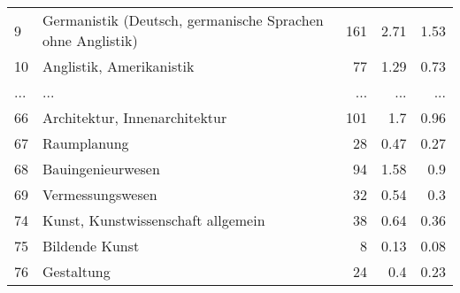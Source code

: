 \begin{longtable}{lXrrr}
        9 & \multicolumn{1}{X}{Germanistik (Deutsch, germanische Sprachen ohne Anglistik)} & %
          \num{161} &
          \num[round-mode=places,round-precision=2]{2.71} &
          \num[round-mode=places,round-precision=2]{1.53} \\
        10 & \multicolumn{1}{X}{Anglistik, Amerikanistik} & %
          \num{77} &
          \num[round-mode=places,round-precision=2]{1.29} &
          \num[round-mode=places,round-precision=2]{0.73} \\
       ... & ... & ... & ... & ... \\
        66 & \multicolumn{1}{X}{Architektur, Innenarchitektur} & %
          \num{101} &
          \num[round-mode=places,round-precision=2]{1.7} &
          \num[round-mode=places,round-precision=2]{0.96} \\

        67 & \multicolumn{1}{X}{Raumplanung} & %
          \num{28} &
          \num[round-mode=places,round-precision=2]{0.47} &
          \num[round-mode=places,round-precision=2]{0.27} \\

        68 & \multicolumn{1}{X}{Bauingenieurwesen} & %
          \num{94} &
          \num[round-mode=places,round-precision=2]{1.58} &
          \num[round-mode=places,round-precision=2]{0.9} \\

        69 & \multicolumn{1}{X}{Vermessungswesen} & %
          \num{32} &
          \num[round-mode=places,round-precision=2]{0.54} &
          \num[round-mode=places,round-precision=2]{0.3} \\

        74 & \multicolumn{1}{X}{Kunst, Kunstwissenschaft allgemein} & %
          \num{38} &
          \num[round-mode=places,round-precision=2]{0.64} &
          \num[round-mode=places,round-precision=2]{0.36} \\

        75 & \multicolumn{1}{X}{Bildende Kunst} & %
          \num{8} &
          \num[round-mode=places,round-precision=2]{0.13} &
          \num[round-mode=places,round-precision=2]{0.08} \\

        76 & \multicolumn{1}{X}{Gestaltung} & %
          \num{24} &
          \num[round-mode=places,round-precision=2]{0.4} &
          \num[round-mode=places,round-precision=2]{0.23} \\


\end{longtable}
